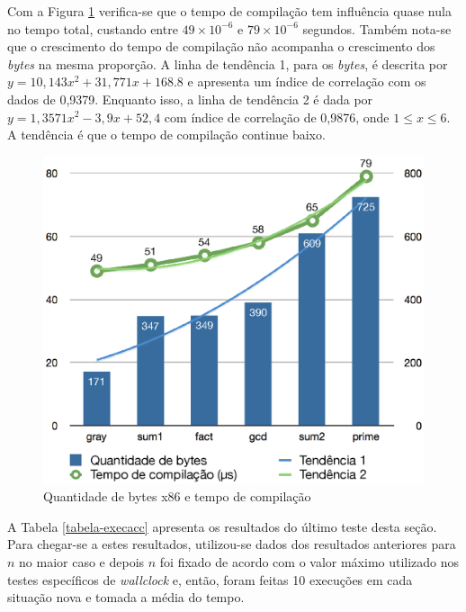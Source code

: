 Com a Figura \ref{fig:tempo-compilacao} verifica-se que o tempo de
compilação tem influência quase nula no tempo total, custando entre
$49 \times 10^{-6}$ e $79 \times 10^{-6}$ segundos. Também nota-se que
o crescimento do tempo de compilação não acompanha o crescimento dos
\textit{bytes} na mesma proporção.
A linha de tendência 1, para os \textit{bytes}, é
descrita por $y = 10,143x^2 + 31,771x + 168.8$ e apresenta um índice
de correlação com os dados de 0,9379. Enquanto isso, a linha de
tendência 2 é dada por $y = 1,3571x^2 - 3,9x + 52,4$ com índice de
correlação de 0,9876, onde $1 \le x \le 6$. A tendência é que o tempo
de compilação continue baixo.

\begin{figure}[ht]
  \centering
  \includegraphics[scale=0.71]{figs/tempo_compilacao}
  \caption{Quantidade de bytes x86 e tempo de compilação \label{fig:tempo-compilacao}}
\end{figure}

A Tabela \ref{tabela-execacc} apresenta os resultados do último teste
desta seção. Para chegar-se a estes resultados, utilizou-se dados dos
resultados anteriores para $n$ no maior caso e depois $n$ foi fixado
de acordo com o valor máximo utilizado nos testes específicos de
\textit{wallclock} e, então, foram feitas 10 execuções em cada
situação nova e tomada a média do tempo.

